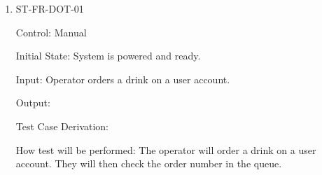 \documentclass[12pt, titlepage]{article}
\begin{document}
\begin{enumerate}

\item{ST-FR-DOT-01\\}

Control: Manual
					
Initial State: System is powered and ready.
					
Input: Operator orders a drink on a user account.
					
Output: 

Test Case Derivation: 
					
How test will be performed: The operator will order a drink on a user account. They will then check the order number in the queue.
					














\end{enumerate}
\end{document}
